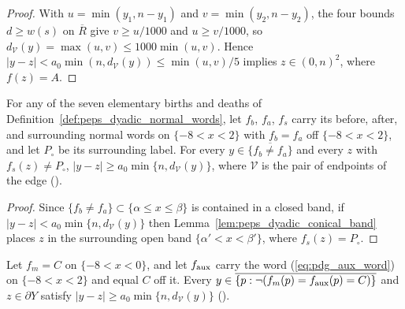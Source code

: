 \begin{proof}\leanok
    With $u=\min(y_1,n-y_1)$ and $v=\min(y_2,n-y_2)$, the four bounds $d\ge w(s)$
    on $\overline R$ give $v\ge u/1000$ and $u\ge v/1000$, so
    $d_{\mathcal V}(y)=\max(u,v)\le1000\min(u,v)$. Hence
    $|y-z|<a_0\min(n,d_{\mathcal V}(y))\le\min(u,v)/5$ implies $z\in(0,n)^2$,
    where $f(z)=A$.
\end{proof}

\begin{lemma}
    \label{thm:peps_dyadic_band_clearance}
    \leanok
    For any of the seven elementary births and deaths of
    Definition~\ref{def:peps_dyadic_normal_words}, let $f_b$, $f_a$, $f_s$ carry
    its before, after, and surrounding normal words on $\{-8<x<2\}$ with
    $f_b=f_a$ off $\{-8<x<2\}$, and let $P_\circ$ be its surrounding label. For
    every $y\in\overline{\{f_b\ne f_a\}}$ and every $z$ with $f_s(z)\ne P_\circ$,
    $|y-z|\ge a_0\min\{n,d_{\mathcal V}(y)\}$, where $\mathcal V$ is the pair of
    endpoints of the edge (\cite[Lemma~7.2]{OpenAI2026PolynomialPEPS}).
\end{lemma}

\begin{proof}\leanok
    Since $\{f_b\ne f_a\}\subset\{\alpha\le x\le\beta\}$ is contained in a closed
    band, if $|y-z|<a_0\min\{n,d_{\mathcal V}(y)\}$ then
    Lemma~\ref{lem:peps_dyadic_conical_band} places $z$ in the surrounding open
    band $\{\alpha'<x<\beta'\}$, where $f_s(z)=P_\circ$.
\end{proof}

\begin{lemma}
    \label{thm:peps_dyadic_lens_clearance}
    \leanok
    Let $f_m=C$ on $\{-8<x<0\}$, and let $f_{\rm aux}$ carry the word
    (\ref{eq:pdg_aux_word}) on $\{-8<x<2\}$ and equal $C$ off it. Every
    $y\in\overline{\{p:\neg(f_m(p)=f_{\rm aux}(p)=C)\}}$ and $z\in\partial Y$
    satisfy $|y-z|\ge a_0\min\{n,d_{\mathcal V}(y)\}$
    (\cite[Lemma~7.2]{OpenAI2026PolynomialPEPS}).
\end{lemma}

